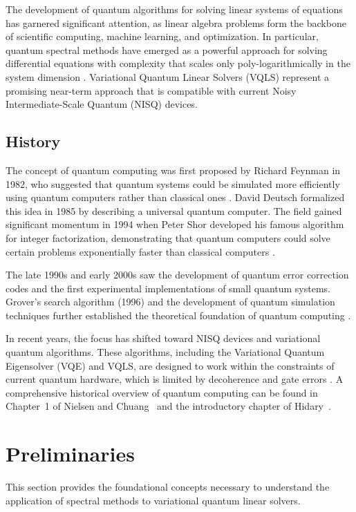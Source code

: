 \documentclass[a4paper,12pt]{amsart}
\begin{document}
The development of quantum algorithms for solving linear systems of equations has garnered significant attention, as linear algebra problems form the backbone of scientific computing, machine learning, and optimization. In particular, quantum spectral methods have emerged as a powerful approach for solving differential equations with complexity that scales only poly-logarithmically in the system dimension \cite{childs2020spectral}. Variational Quantum Linear Solvers (VQLS) represent a promising near-term approach that is compatible with current Noisy Intermediate-Scale Quantum (NISQ) devices.

\subsection{History}
The concept of quantum computing was first proposed by Richard Feynman in 1982, who suggested that quantum systems could be simulated more efficiently using quantum computers rather than classical ones \cite{nielsen2011quantum}. David Deutsch formalized this idea in 1985 by describing a universal quantum computer. The field gained significant momentum in 1994 when Peter Shor developed his famous algorithm for integer factorization, demonstrating that quantum computers could solve certain problems exponentially faster than classical computers \cite{nielsen2011quantum, yanofsky2008quantum}.

The late 1990s and early 2000s saw the development of quantum error correction codes and the first experimental implementations of small quantum systems. Grover's search algorithm (1996) and the development of quantum simulation techniques further established the theoretical foundation of quantum computing \cite{nielsen2011quantum}.

In recent years, the focus has shifted toward NISQ devices and variational quantum algorithms. These algorithms, including the Variational Quantum Eigensolver (VQE) and VQLS, are designed to work within the constraints of current quantum hardware, which is limited by decoherence and gate errors \cite{hidary2021quantum, schuld2018supervised}. A comprehensive historical overview of quantum computing can be found in Chapter~1 of Nielsen and Chuang~\cite{nielsen2011quantum} and the introductory chapter of Hidary~\cite{hidary2021quantum}.

\section{Preliminaries}
This section provides the foundational concepts necessary to understand the application of spectral methods to variational quantum linear solvers.
\end{document}
